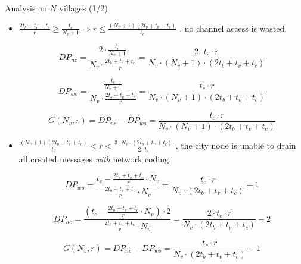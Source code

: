 \documentclass[compress]{beamer}
\newcommand\Fontvi{\fontsize{6}{7.2}\selectfont}
\begin{document}
\begin{frame}{Analysis on $N$ villages (1/2)}
	\Fontvi
	\begin{itemize}
		
		\item $\frac{2t_b + t_v + t_c}{r} \ge \frac{t_c}{N_v + 1} 
		      \Rightarrow r \le \frac{(N_v + 1)(2t_b + t_v + t_c)}{t_c}$
		      , no channel access is wasted.
		      
		      \begin{equation}
		      	DP_{nc} 
		      	= \frac{2 \cdot \frac{t_c}{N_v + 1}}
		      	{N_v \cdot \frac{2t_b + t_v + t_c}{r}} 
		      	= \frac{2 \cdot t_c \cdot r}{N_v \cdot (N_v + 1) \cdot (2t_b + t_v + t_c)}
		      \end{equation}
		      
		      \begin{equation}
		      	DP_{wo}
		      	= \frac{\frac{t_c}{N_v + 1}}
		      	{N_v \cdot \frac{2t_b + t_v + t_c}{r}} 
		      	= \frac{t_c \cdot r}{N_v \cdot (N_v + 1) \cdot (2t_b + t_v + t_c)}
		      \end{equation}
		      
		      \begin{equation}
		      	G(N_v, r) = DP_{nc} - DP_{wo} =  \frac{t_c \cdot r}{N_v \cdot (N_v + 1) \cdot (2t_b + t_v + t_c)}
		      \end{equation}
		      
		\item $\frac{(N_v + 1)(2t_b + t_v + t_c)}{t_c} < r < \frac{3 \cdot N_v \cdot (2t_b + t_v + t_c)}{2 \cdot t_c}$
		      , the city node is unable to drain all created messages \emph{with} network coding.
		      
		      \begin{equation}
		      	DP_{wo} 
		      	= \frac
		      	{t_c - \frac{2t_b + t_v + t_c}{r} \cdot N_v}
		      	{\frac{2t_b + t_v + t_c}{r} \cdot N_v} 
		      	= \frac{t_c \cdot r}{N_v \cdot (2t_b + t_v + t_c)} - 1
		      \end{equation}
		      
		      
		      \begin{equation}
		      	DP_{nc} 
		      	= \frac
		      	{(t_c - \frac{2t_b + t_v + t_c}{r} \cdot N_v) \cdot 2}
		      	{\frac{2t_b + t_v + t_c}{r} \cdot N_v} 
		      	= \frac{2 \cdot t_c \cdot r}{N_v \cdot (2t_b + t_v + t_c)} - 2
		      \end{equation}
		      
		      
		      \begin{equation}
		      	G(N_v, r) = DP_{nc} - DP_{wo} =  \frac{t_c \cdot r}{N_v \cdot (2t_b + t_v + t_c)} - 1
		      \end{equation}
		      
	\end{itemize}
\end{frame}
\end{document}
